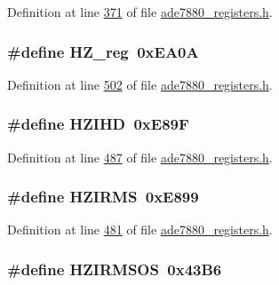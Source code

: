 Definition at line \hyperlink{a00036_source_l00371}{371} of file \hyperlink{a00036_source}{ade7880\-\_\-registers.\-h}.

\hypertarget{a00036_ac2c2eb2bf06da994f80b7c84a98fbbff}{
\subsubsection[{H\-Z\-\_\-reg}]{\setlength{\rightskip}{0pt plus 5cm}\#define H\-Z\-\_\-reg~0x\-E\-A0\-A}}\label{de/d8c/a00036_ac2c2eb2bf06da994f80b7c84a98fbbff}


Definition at line \hyperlink{a00036_source_l00502}{502} of file \hyperlink{a00036_source}{ade7880\-\_\-registers.\-h}.

\hypertarget{a00036_a56de93637570af225bf16eeb5dc75b53}{
\subsubsection[{H\-Z\-I\-H\-D}]{\setlength{\rightskip}{0pt plus 5cm}\#define H\-Z\-I\-H\-D~0x\-E89\-F}}\label{de/d8c/a00036_a56de93637570af225bf16eeb5dc75b53}


Definition at line \hyperlink{a00036_source_l00487}{487} of file \hyperlink{a00036_source}{ade7880\-\_\-registers.\-h}.

\hypertarget{a00036_a422744a9f0c3a47ad3818902a10a4f73}{
\subsubsection[{H\-Z\-I\-R\-M\-S}]{\setlength{\rightskip}{0pt plus 5cm}\#define H\-Z\-I\-R\-M\-S~0x\-E899}}\label{de/d8c/a00036_a422744a9f0c3a47ad3818902a10a4f73}


Definition at line \hyperlink{a00036_source_l00481}{481} of file \hyperlink{a00036_source}{ade7880\-\_\-registers.\-h}.

\hypertarget{a00036_a1deadee161ae214be5ccc72f76eade2d}{
\subsubsection[{H\-Z\-I\-R\-M\-S\-O\-S}]{\setlength{\rightskip}{0pt plus 5cm}\#define H\-Z\-I\-R\-M\-S\-O\-S~0x43\-B6}}\label{de/d8c/a00036_a1deadee161ae214be5ccc72f76eade2d}


